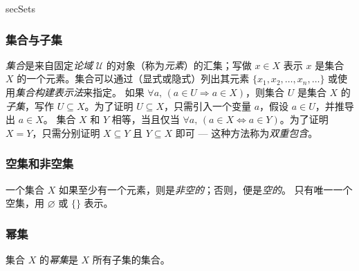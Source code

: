 \begin{tldr}{secSets}

\subsubsection*{集合与子集}

\begin{tldrlist}
 \textit{集合}是来自固定\textit{论域} $\mathcal{U}$ 的对象（称为\textit{元素}）的汇集；写做 $x \in X$ 表示 $x$ 是集合 $X$ 的一个元素。集合可以通过（显式或隐式）列出其元素 $\{ x_1, x_2, \dots, x_n, \dots \}$ 或使用\textit{集合构建表示法}来指定。
 如果 $\forall a,\, (a \in U \Rightarrow a \in X)$，则集合 $U$ 是集合 $X$ 的\textit{子集}，写作 $U \subseteq X$。为了证明 $U \subseteq X$，只需引入一个变量 $a$，假设 $a \in U$，并推导出 $a \in X$。
 集合 $X$ 和 $Y$ 相等，当且仅当 $\forall a,\, (a \in X \Leftrightarrow a \in Y)$。为了证明 $X = Y$，只需分别证明 $X \subseteq Y$ 且 $Y \subseteq X$ 即可 --- 这种方法称为\textit{双重包含}。
\end{tldrlist}

\subsubsection*{空集和非空集}

\begin{tldrlist}
 一个集合 $X$ 如果至少有一个元素，则是\textit{非空的}；否则，便是\textit{空的}。
 只有唯一一个空集，用 $\varnothing$ 或 $\{ \}$ 表示。
\end{tldrlist}

\subsubsection*{幂集}
\begin{tldrlist}
 集合 $X$ 的\textit{幂集}是 $X$ 所有子集的集合。
\end{tldrlist}
\end{tldr}